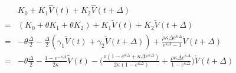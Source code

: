 \documentclass{ws-ijfe}
\begin{document}
\begin{equation}\label{QEK0K1K2}
\begin{split}
&K_0+K_1\hat{V}(t)+K_2\hat{V}(t+\Delta)\\
=&(K_0+\theta K_1+\theta K_2)+K_1\tilde{V}(t)+K_2\tilde{V}(t+\Delta)\\
=&-\theta\frac{\Delta}{2}-\frac{\Delta}{2}(\gamma_1\tilde{V}(t)+\gamma_2\tilde{V}(t+\Delta))+\frac{\rho\kappa\Delta e^{\kappa\Delta}}{e^{\kappa\Delta}-1}\mathring{V}(t+\Delta)\\
=&-\theta\frac{\Delta}{2}-\frac{1-e^{-\kappa\Delta}}{2\kappa}\tilde{V}(t)-\bigg(\frac{\nu(1-e^{\kappa\Delta}+\kappa\Delta e^{\kappa\Delta})}{2\kappa(1-e^{\kappa\Delta})}+\frac{\rho\kappa\Delta e^{\kappa\Delta}}{1-e^{\kappa\Delta}}\bigg)\mathring{V}(t+\Delta)
\end{split}
\end{equation}
%
\end{document}
